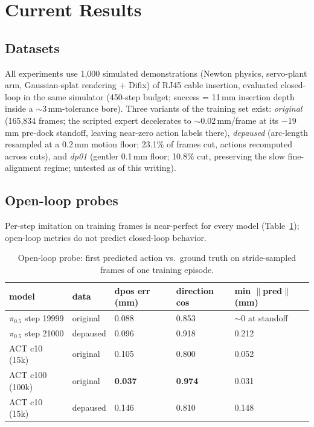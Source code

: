 \section{Current Results}

\subsection{Datasets}
All experiments use 1{,}000 simulated demonstrations (Newton physics, servo-plant arm,
Gaussian-splat rendering + Difix) of RJ45 cable insertion, evaluated closed-loop in the
same simulator (450-step budget; success = 11\,mm insertion depth inside a
$\sim$3\,mm-tolerance bore). Three variants of the training set exist:
\emph{original} (165{,}834 frames; the scripted expert decelerates to
$\sim$0.02\,mm/frame at its $-19$\,mm pre-dock standoff, leaving near-zero action
labels there), \emph{depaused} (arc-length resampled at a 0.2\,mm motion floor;
23.1\% of frames cut, actions recomputed across cuts), and \emph{dp01}
(gentler 0.1\,mm floor; 10.8\% cut, preserving the slow fine-alignment regime;
untested as of this writing).

\subsection{Open-loop probes}
Per-step imitation on training frames is near-perfect for every model
(Table~\ref{tab:probe}); open-loop metrics do not predict closed-loop behavior.

\begin{table}[h]\centering\small
\begin{tabular}{lllll}
\toprule
model & data & dpos err (mm) & direction cos & min $\lVert$pred$\rVert$ (mm) \\
\midrule
$\pi_{0.5}$ step 19999 & original & 0.088 & 0.853 & $\sim$0 at standoff \\
$\pi_{0.5}$ step 21000 & depaused & 0.096 & 0.918 & 0.212 \\
ACT c10 (15k)          & original & 0.105 & 0.800 & 0.052 \\
ACT c100 (100k)        & original & \textbf{0.037} & \textbf{0.974} & 0.031 \\
ACT c10 (15k)          & depaused & 0.146 & 0.810 & 0.148 \\
\bottomrule
\end{tabular}
\caption{Open-loop probe: first predicted action vs.\ ground truth on stride-sampled
frames of one training episode.}
\label{tab:probe}
\end{table}

